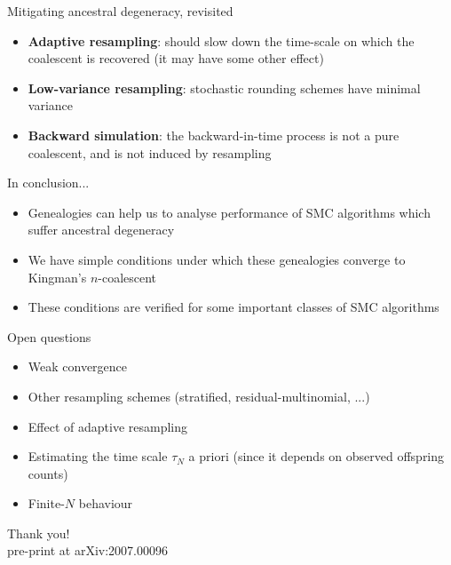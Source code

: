 \documentclass[aspectratio=169]{beamer}
\theoremstyle{definition}
\begin{document}
\begin{frame}{Mitigating ancestral degeneracy, revisited}
\pause
\begin{itemize}[<+->]
\item \textbf{Adaptive resampling}: should slow down the time-scale on which the coalescent is recovered (it may have some other effect)
\item \textbf{Low-variance resampling}: stochastic rounding schemes have minimal variance
\item \textbf{Backward simulation}: the backward-in-time process is not a pure coalescent, and is not induced by resampling
\end{itemize}
\end{frame}


\begin{frame}{In conclusion...}
\begin{itemize}
\item Genealogies can help us to analyse performance of SMC algorithms which suffer ancestral degeneracy
\item We have simple conditions under which these genealogies converge to Kingman's $n$-coalescent
\item These conditions are verified for some important classes of SMC algorithms
\end{itemize}
\end{frame}


\begin{frame}{Open questions}
\begin{itemize}
\item Weak convergence
\item Other resampling schemes (stratified, residual-multinomial, ...)
\item Effect of adaptive resampling
\item Estimating the time scale $\tau_N$ a priori (since it depends on observed offspring counts)
\item Finite-$N$ behaviour
\end{itemize}
\end{frame}


\begin{frame}
\centering
\vspace{1cm}
{\Large Thank you!}\\
\vspace{1cm}
pre-print at arXiv:2007.00096
\end{frame}
\end{document}
